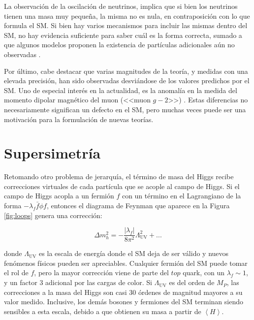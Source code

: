 La observación de la oscilación de neutrinos, implica que si bien los neutrinos tienen una masa muy pequeña, la misma no es nula, en contraposición con lo que formula el SM. Si bien hay varios mecanismos para incluir las mismas dentro del SM, no hay evidencia suficiente para saber cuál es la forma correcta, 
sumado a que algunos modelos proponen la existencia de partículas adicionales aún no observadas \cite{gellmann2013,Sawada:1979dis,Glashow:1979nm,Ramond1998}.

Por último, cabe destacar que varias magnitudes de la teoría, y medidas con una elevada precisión, han sido observadas desviándose de los valores predichos por el SM. Uno de especial interés en la actualidad, es la anomalía en la medida del momento dipolar magnético del muon (<<muon $g-2$>>) \cite{Muong-2:2021ojo}. Estas diferencias no necesariamente significan un defecto en el SM, pero muchas veces puede ser una motivación para la formulación de nuevas teorías.

\section{Supersimetría}\label{sec:susy}

Retomando otro problema de jerarquía, el término de masa del Higgs recibe correcciones virtuales de cada partícula que se acople al campo de Higgs. 
Si el campo de Higgs acopla a un fermión $f$ con un término en el Lagrangiano de la forma $-\lambda_f \bar{f} \phi f$, entonces el diagrama de Feynman que aparece en la Figura \ref{fig:loops} genera una corrección:


\begin{equation}
	\Delta m_h^2 = - \frac{|\lambda_f|}{8 \pi^2}\Lambda_{\text{UV}}^2 + ...
\end{equation}

\noindent
donde $\Lambda_{\text{UV}}$ es la escala de energía donde el SM deja de ser válido y nuevos fenómenos físicos pueden ser apreciables. Cualquier fermión del SM puede tomar el rol de $f$, pero la mayor corrección viene de parte del $top$ quark, con un $\lambda_f\sim1$, y un factor $3$ adicional por las cargas de color. Si $\Lambda_{\text{UV}}$ es del orden de $M_P$, las correcciones a la masa del Higgs son casi 30 órdenes de magnitud mayores a su valor medido. 
Inclusive, los demás bosones y fermiones del SM terminan siendo sensibles a esta escala, debido a que obtienen su masa a partir de $\left<H\right>$.

